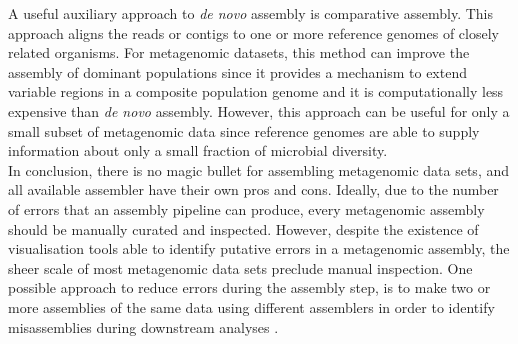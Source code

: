 A useful auxiliary approach to \textit{de novo} assembly is comparative assembly. This approach aligns the reads or contigs to one or more reference genomes of closely related organisms. For metagenomic datasets, this method can improve the assembly of dominant populations since it provides a mechanism to extend variable regions in a composite population genome and it is computationally less expensive than \textit{de novo} assembly. However, this approach can be useful for only a small subset of metagenomic data since reference genomes are able to supply information about only a small fraction of microbial diversity.\\
In conclusion, there is no magic bullet for assembling metagenomic data sets, and all available assembler have their own pros and cons. Ideally, due to the number of errors that an assembly pipeline can produce, every metagenomic assembly should be manually curated and inspected. However, despite the existence of visualisation tools able to identify putative errors in a metagenomic assembly, the sheer scale of most metagenomic data sets preclude manual inspection. One possible approach to reduce errors during the assembly step, is to make two or more assemblies of the same data using different assemblers in order to identify misassemblies during downstream analyses \cite{martin2006metagenomic}.\\

